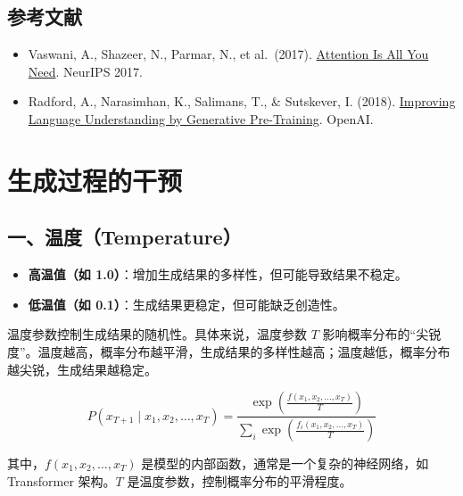 \hypertarget{ux53c2ux8003ux6587ux732e-74}{%
\subsection{参考文献}\label{ux53c2ux8003ux6587ux732e-74}}

\vspace{0.25em}
\begin{itemize}
\tightlist
\item
  Vaswani, A., Shazeer, N., Parmar, N., et al.~(2017). \href{https://arxiv.org/abs/1706.03762}{Attention Is All You Need}. NeurIPS 2017.
\item
  Radford, A., Narasimhan, K., Salimans, T., \& Sutskever, I. (2018). \href{https://cdn.openai.com/research-covers/language-unsupervised/language_understanding_paper.pdf}{Improving Language Understanding by Generative Pre-Training}. OpenAI.
\end{itemize}

\clearpage

\hypertarget{ux751fux6210ux8fc7ux7a0bux7684ux5e72ux9884}{%
\section{生成过程的干预}\label{ux751fux6210ux8fc7ux7a0bux7684ux5e72ux9884}}

\hypertarget{ux4e00ux6e29ux5ea6temperature}{%
\subsection{一、温度（Temperature）}\label{ux4e00ux6e29ux5ea6temperature}}

\begin{itemize}
\tightlist
\item
  \textbf{高温值（如 1.0）}：增加生成结果的多样性，但可能导致结果不稳定。
\item
  \textbf{低温值（如 0.1）}：生成结果更稳定，但可能缺乏创造性。
\end{itemize}

温度参数控制生成结果的随机性。具体来说，温度参数 \(T\) 影响概率分布的``尖锐度''。温度越高，概率分布越平滑，生成结果的多样性越高；温度越低，概率分布越尖锐，生成结果越稳定。

\[
P(x_{T+1} \mid x_1, x_2, \ldots, x_T) =
\frac{\exp\left(\frac{f(x_1,x_2,\ldots,x_T)}{T}\right)}
{\sum_i \exp\left(\frac{f_i(x_1,x_2,\ldots,x_T)}{T}\right)}
\]

其中，\(f(x_1,x_2,\ldots,x_T)\) 是模型的内部函数，通常是一个复杂的神经网络，如 Transformer 架构。\(T\) 是温度参数，控制概率分布的平滑程度。

